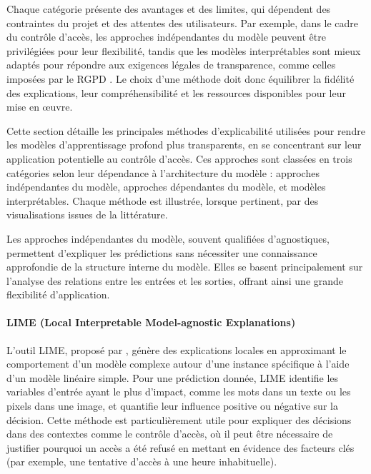 Chaque catégorie présente des avantages et des limites, qui dépendent des contraintes du projet et des attentes des utilisateurs. Par exemple, dans le cadre du contrôle d'accès, les approches indépendantes du modèle peuvent être privilégiées pour leur flexibilité, tandis que les modèles interprétables sont mieux adaptés pour répondre aux exigences légales de transparence, comme celles imposées par le RGPD \cite{guidotti2018}. Le choix d’une méthode doit donc équilibrer la fidélité des explications, leur compréhensibilité et les ressources disponibles pour leur mise en œuvre.






Cette section détaille les principales méthodes d'explicabilité utilisées pour rendre les modèles d'apprentissage profond plus transparents, en se concentrant sur leur application potentielle au contrôle d'accès. Ces approches sont classées en trois catégories selon leur dépendance à l'architecture du modèle : approches indépendantes du modèle, approches dépendantes du modèle, et modèles interprétables. Chaque méthode est illustrée, lorsque pertinent, par des visualisations issues de la littérature.


Les approches indépendantes du modèle, souvent qualifiées d'agnostiques, permettent d'expliquer les prédictions sans nécessiter une connaissance approfondie de la structure interne du modèle. Elles se basent principalement sur l'analyse des relations entre les entrées et les sorties, offrant ainsi une grande flexibilité d'application.

\paragraph{LIME (Local Interpretable Model-agnostic Explanations)}  
L'outil LIME, proposé par \cite{ribeiro2016lime}, génère des explications locales en approximant le comportement d'un modèle complexe autour d'une instance spécifique à l'aide d'un modèle linéaire simple. Pour une prédiction donnée, LIME identifie les variables d'entrée ayant le plus d'impact, comme les mots dans un texte ou les pixels dans une image, et quantifie leur influence positive ou négative sur la décision. Cette méthode est particulièrement utile pour expliquer des décisions dans des contextes comme le contrôle d'accès, où il peut être nécessaire de justifier pourquoi un accès a été refusé en mettant en évidence des facteurs clés (par exemple, une tentative d'accès à une heure inhabituelle).  

